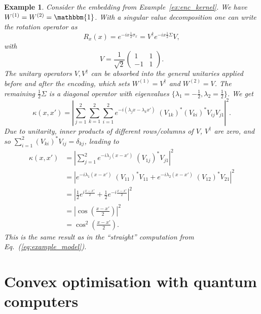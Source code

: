 \documentclass[aps, reprint, onecolumn, nofootinbib, longbibliography]{revtex4-2}
\newtheorem{example}{Example}[section]
\begin{document}
\begin{example}
Consider the embedding from Example~\ref{ex:enc_kernel}. We have $W^{(1)} = W^{(2)} = \mathbbm{1}$. With a singular value decomposition one can write the rotation operator as 
\begin{equation}
R_x(x) = e^{-i x\frac{1}{2} \sigma_x} = V^{\dagger} e^{-i x\frac{1}{2} \Sigma} V,
\end{equation}
with 
\begin{equation}
V =\frac{1}{\sqrt{2}} \begin{pmatrix} 1& 1 \\ -1& 1\end{pmatrix}.
\end{equation}
The unitary operators $V, V^{\dagger}$ can be absorbed into the general unitaries applied before and after the encoding, which sets $W^{(1)} = V^{\dagger}$ and $W^{(2)} = V$. The remaining $\frac{1}{2} \Sigma$ is a diagonal operator with eigenvalues $\{\lambda_1=-\frac{1}{2}, \lambda_2=\frac{1}{2}\}$. We get
\begin{equation}
    \kappa(x, x') 
    = \left|\sum_{j = 1}^{2} \sum_{k= 1}^{2} \sum_{i=1}^2 e^{-i (\lambda_{j}x- \lambda_{k}x') } \; (V_{1 k})^*  (V_{k i})^*  V_{i j} V_{j 1} \right|^2.
\end{equation}
Due to unitarity, inner products of different rows/columns of $V$, $V^{\dagger}$ are zero, and so  $\sum_{i=1}^2 (V_{k i})^*  V_{i j} = \delta_{k j}$, leading to
\begin{align} 
    \kappa(x, x') 
    &= \left|\sum_{j = 1}^{2}  e^{-i \lambda_{j}(x- x') } \; (V_{1 j})^* V_{j 1} \right|^2\\
    &= \left|e^{-i \lambda_1(x-x' )} \; (V_{1 1})^* V_{1 1}  
        + e^{-i \lambda_2(x-x') } \; (V_{1 2})^* V_{2 1}\right|^2  \\ 
    &= \left|\frac{1}{2}e^{i \frac{x- x'}{2}}  + \frac{1}{2}e^{-i \frac{x - x'}{2} }  \right|^2\\
    &=| \cos\left(\frac{x- x'}{2}\right)|^2\\
    &= \cos^2\left(\frac{x- x'}{2}\right).
\end{align}
This is the same result as in the ``straight'' computation from Eq.~(\ref{eq:example_model}).
\end{example}

\section{Convex optimisation with quantum computers}\label{app:outlook}
\end{document}
